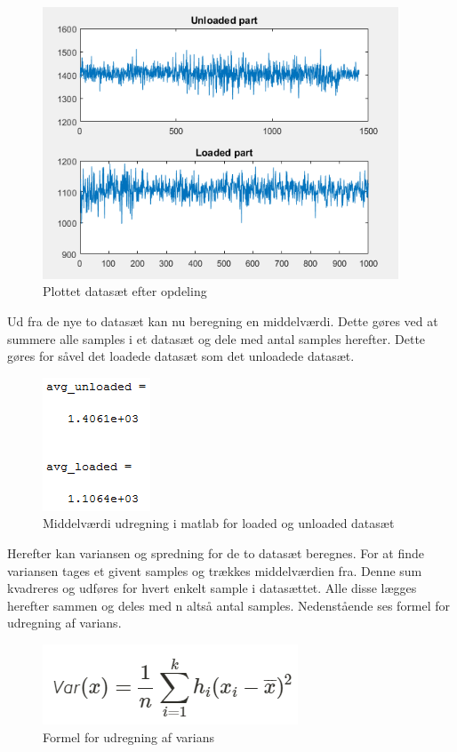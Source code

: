 \begin{figure}[H]
\centering
\includegraphics[width = 300pt]{Img/EfterOpdeling.PNG}
\caption{Plottet datasæt efter opdeling}
\label{fig:EfterOpdeling}
\end{figure}

Ud fra de nye to datasæt kan nu beregning en middelværdi. Dette gøres ved at summere alle samples i et datasæt og dele med antal samples herefter. Dette gøres for såvel det loadede datasæt som det unloadede datasæt.

\begin{figure}[H]
\centering
\includegraphics{Img/Middelvaerdi.PNG}
\caption{Middelværdi udregning i matlab for loaded og unloaded datasæt}
\label{fig:Middelvaerdi}
\end{figure}

Herefter kan variansen og spredning for de to datasæt beregnes. For at finde variansen tages et givent samples og trækkes middelværdien fra. Denne sum kvadreres og udføres for hvert enkelt sample i datasættet. Alle disse lægges herefter sammen og deles med n altså antal samples. Nedenstående ses formel for udregning af varians. 

\begin{figure}[H]
\centering
\includegraphics{Img/Varians.PNG}
\caption{Formel for udregning af varians}
\label{fig:Varians}
\end{figure}


